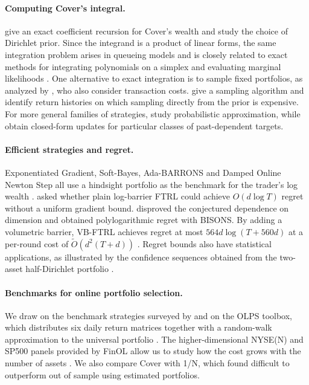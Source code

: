 \documentclass{article}
\numberwithin{equation}{section}
\newcounter{algorithm}
\theoremstyle{remark}
\begin{document}
\paragraph{Computing Cover's integral.}
\citet{coverordentlich1996} give an exact coefficient recursion for Cover's
wealth and study the choice of Dirichlet prior. Since the integrand is a
product of linear forms, the same integration problem arises in queueing
models \citep{casale2017} and is closely related to exact methods for
integrating polynomials on a simplex and evaluating marginal likelihoods
\citep{baldoni2011,lin2009}. One alternative to exact integration is to
sample fixed portfolios, as analyzed by \citet{blumkalai1999}, who also
consider transaction costs. \citet{kalai2002} give a sampling algorithm and
identify return histories on which sampling directly from the prior is
expensive. For more general families of strategies, \citet{akcoglu2004}
study probabilistic approximation, while \citet{crossbarron2003} obtain
closed-form updates for particular classes of past-dependent targets.

\paragraph{Efficient strategies and regret.}
Exponentiated Gradient, Soft-Bayes, Ada-BARRONS and Damped Online Newton
Step all use a hindsight portfolio as the benchmark for the trader's log
wealth \citep{helmbold1998,orseau2017,luo2018,mhammedi2022}.
\citet{vanerven2020} asked whether plain log-barrier FTRL could achieve
$O(d\log T)$ regret without a uniform gradient bound. \citet{zimmert2022}
disproved the conjectured dependence on dimension and obtained
polylogarithmic regret with BISONS. By adding a volumetric barrier,
VB-FTRL achieves regret at most $564d\log(T+560d)$ at a per-round cost of
$\widetilde O(d^2(T+d))$ \citep[Theorem~4.1 of the preprint]{jezequel2026}.
Regret bounds also have statistical applications, as illustrated by the
confidence sequences obtained from the two-asset half-Dirichlet portfolio
\citep{orabona2024}.

\paragraph{Benchmarks for online portfolio selection.}
We draw on the benchmark strategies surveyed by \citet{li2014survey} and
on the OLPS toolbox, which distributes six daily return matrices together
with a random-walk approximation to the universal portfolio
\citep{li2016olps}. The higher-dimensional NYSE(N) and SP500 panels
provided by FinOL allow us to study how the cost grows with the number
of assets \citep{finol}. We also compare Cover with 1/N, which \citet{demiguel2009optimal}
found difficult to outperform out of sample using estimated portfolios.
\end{document}
